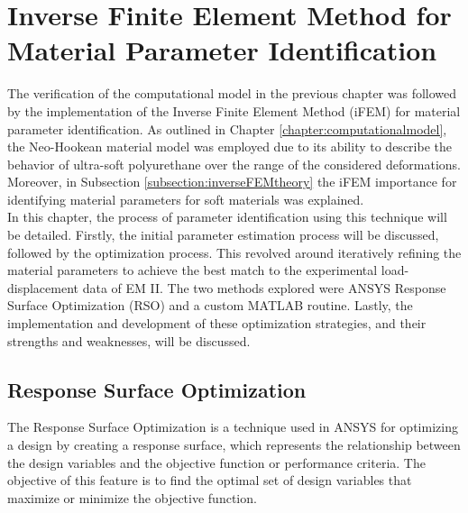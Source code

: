 
\chapter{Inverse Finite Element Method for Material Parameter Identification} %
\label{iFEMthesis} %

The verification of the computational model in the previous chapter was followed by the implementation
of the Inverse Finite Element Method (iFEM) for material parameter identification.
As outlined in Chapter \ref{chapter:computationalmodel}, the Neo-Hookean material model
was employed due to its ability to describe the behavior of ultra-soft polyurethane over 
the range of the considered deformations. Moreover, in Subsection \ref{subsection:inverseFEMtheory} 
the iFEM importance for identifying material parameters for soft materials was explained.\\

In this chapter, the process of parameter identification 
using this technique will be detailed. Firstly, the initial parameter estimation process will be discussed, 
followed by the optimization process. This revolved around iteratively refining the material parameters
to achieve the best match to the experimental load-displacement data of EM II. The two methods 
explored were ANSYS Response Surface Optimization (RSO) and a custom MATLAB routine. Lastly, the implementation 
and development of these optimization strategies, and their strengths and weaknesses, 
will be discussed. 

\section{Response Surface Optimization}
The Response Surface Optimization is a technique used in ANSYS for optimizing a design by creating 
a response surface, which represents the relationship between the design variables and the objective 
function or performance criteria. The objective of this feature is to find the optimal set of design 
variables that maximize or minimize the objective function.

